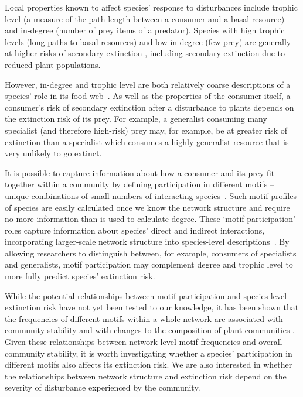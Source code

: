 \documentclass[12pt]{article}
\begin{document}
\begin{spacing}{2.0}
    
    Local properties known to affect species' response to disturbances include trophic level (a measure of the path length between a consumer and a basal resource) and in-degree (number of prey items of a predator). 
    Species with high trophic levels (long paths to basal resources) and low in-degree (few prey) are generally at higher risks of secondary extinction \citep{binzer2011susceptibility, Eklof2006}, including secondary extinction due to reduced plant populations.

    However, in-degree and trophic level are both relatively coarse descriptions of a species' role in its food web~\citep{Cirtwill2018FoodWebs}. 
    As well as the properties of the consumer itself, a consumer's risk of secondary extinction after a disturbance to plants depends on the extinction risk of its prey.
    For example, a generalist consuming many specialist (and therefore high-risk) prey may, for example, be at greater risk of extinction than a specialist which consumes a highly generalist resource that is very unlikely to go extinct. 

    It is possible to capture information about how a consumer and its prey fit together within a community by defining participation in different motifs -- unique combinations of small numbers of interacting species~\citep{Stouffer2007,Stouffer2012}. 
    Such motif profiles of species are easily calculated once we know the network structure and require no more information than is used to calculate degree.
    These `motif participation' roles capture information about species' direct and indirect interactions, incorporating larger-scale network structure into species-level descriptions~\citep{Cirtwill2015a,Cirtwill2018FoodWebs}. 
    By allowing researchers to distinguish between, for example, consumers of specialists and generalists, motif participation may complement degree and trophic level to more fully predict species' extinction risk. 
    
    While the potential relationships between motif participation and species-level extinction risk have not yet been tested to our knowledge, it has been shown that the frequencies of different motifs within a whole network are associated with community stability \citep{prill2005dynamic, bascompte2005simple} and with changes to the composition of plant communities \citep{giling2019plant}. 
    Given these relationships between network-level motif frequencies and overall community stability, it is worth investigating whether a species' participation in different motifs also affects its extinction risk.
    We are also interested in whether the relationships between network structure and extinction risk depend on the severity of disturbance experienced by the community.


\end{spacing}
\end{document}
